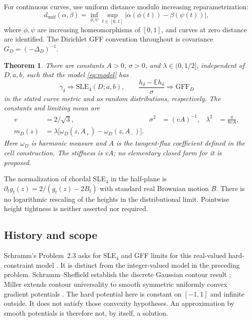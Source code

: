 \documentclass[11pt]{article}
\newtheorem{theorem}{Theorem}[section]
\theoremstyle{definition}
\theoremstyle{remark}
\newcommand{\E}{\mathbb E}
\numberwithin{equation}{section}
\begin{document}
For continuous curves, use uniform distance modulo increasing
reparametrization:
\[
 d_{\mathrm{unif}}(\alpha,\beta)
 =\inf_{\phi,\psi}\sup_{t\in[0,1]}
       |\alpha(\phi(t))-\beta(\psi(t))|,
\]
where $\phi,\psi$ are increasing homeomorphisms of $[0,1]$, and curves
at zero distance are identified. The Dirichlet GFF convention throughout
is covariance $G_D=(-\Delta_D)^{-1}$.

\begin{theorem}\label{thm:main}
There are constants $A>0$, $\sigma>0$, and $\lambda\in(0,1/2]$, independent
of $D,a,b$, such that the model \eqref{eq:model} has
\[
 \gamma_\delta\Longrightarrow\mathrm{SLE}_4(D;a,b),\qquad
 \frac{h_\delta-\E h_\delta}{\sigma}
       \Longrightarrow\mathrm{GFF}_D
\]
in the stated curve metric and as random distributions, respectively.
The constants and limiting mean are
\begin{align}
 v&=2/\sqrt3,&\sigma^2&=(vA)^{-1},&
 \lambda^2&=\frac{\pi}{8vA},\label{eq:target-constants}\\
 m_D(z)&=\lambda\bigl[\omega_D(z,A_+)-\omega_D(z,A_-)\bigr].&&&
 \label{eq:target-mean}
\end{align}
Here $\omega_D$ is harmonic measure and $A$ is the tangent-flux coefficient
defined in the cell construction. The stiffness is $vA$; no elementary
closed form for it is proposed.
\end{theorem}

The normalization of chordal SLE$_4$ in the half-plane is
$\partial_tg_t(z)=2/(g_t(z)-2B_t)$ with standard real Brownian motion $B$.
There is no logarithmic rescaling of the heights in the distributional
limit. Pointwise height tightness is neither asserted nor required.

\subsection{History and scope}
Schramm's Problem~2.3 asks for SLE$_4$ and GFF limits for this real-valued
hard-constraint model \cite{Schramm}. It is distinct from the integer-valued
model in the preceding problem. Schramm--Sheffield establish the discrete
Gaussian contour result \cite{SSdiscrete}; Miller extends contour
universality to smooth symmetric uniformly convex gradient potentials
\cite{Miller}. The hard potential here is constant on $[-1,1]$ and infinite
outside. It does not satisfy those convexity hypotheses. An approximation
by smooth potentials is therefore not, by itself, a solution.
\end{document}

